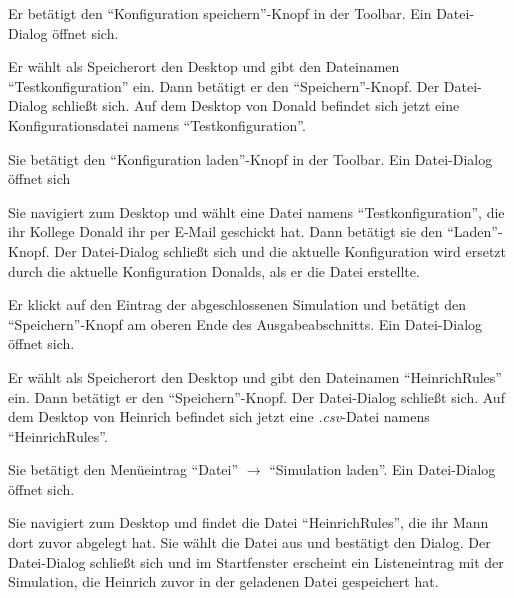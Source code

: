 \documentclass[parskip=full,11pt]{scrartcl}
\begin{document}
{Er betätigt den \enquote{\Gls{Konfiguration} speichern}-Knopf in der Toolbar.}
{Ein Datei-Dialog öffnet sich.}

{Er wählt als Speicherort den Desktop und gibt den Dateinamen \enquote{Testkonfiguration} ein. Dann betätigt er den \enquote{Speichern}-Knopf.}
{Der Datei-Dialog schließt sich. Auf dem Desktop von Donald befindet sich jetzt eine Konfigurationsdatei namens \enquote{Testkonfiguration}.}

{Sie betätigt den \enquote{\Gls{Konfiguration} laden}-Knopf in der Toolbar.}
{Ein Datei-Dialog öffnet sich}

{Sie navigiert zum Desktop und wählt eine Datei namens \enquote{Testkonfiguration}, die ihr Kollege Donald ihr per E-Mail geschickt hat. Dann betätigt sie den \enquote{Laden}-Knopf.}
{Der Datei-Dialog schließt sich und die \Gls{aktuelle Konfiguration} wird ersetzt durch die \Gls{aktuelle Konfiguration} Donalds, als er die Datei erstellte.}

{Er klickt auf den Eintrag der abgeschlossenen Simulation und betätigt den \enquote{Speichern}-Knopf am oberen Ende des Ausgabeabschnitts.}
{Ein Datei-Dialog öffnet sich.}

{Er wählt als Speicherort den Desktop und gibt den Dateinamen \enquote{HeinrichRules} ein. Dann betätigt er den \enquote{Speichern}-Knopf.}
{Der Datei-Dialog schließt sich. Auf dem Desktop von Heinrich befindet sich jetzt eine \textit{.csv}-Datei namens \enquote{HeinrichRules}.}

{Sie betätigt den Menüeintrag \enquote{Datei} \(\rightarrow\) \enquote{Simulation laden}.}
{Ein Datei-Dialog öffnet sich.}

{Sie navigiert zum Desktop und findet die Datei \enquote{HeinrichRules}, die ihr Mann dort zuvor abgelegt hat. Sie wählt die Datei aus und bestätigt den Dialog.}
{Der Datei-Dialog schließt sich und im Startfenster erscheint ein Listeneintrag mit der Simulation, die Heinrich zuvor in der geladenen Datei gespeichert hat.}
\end{document}
